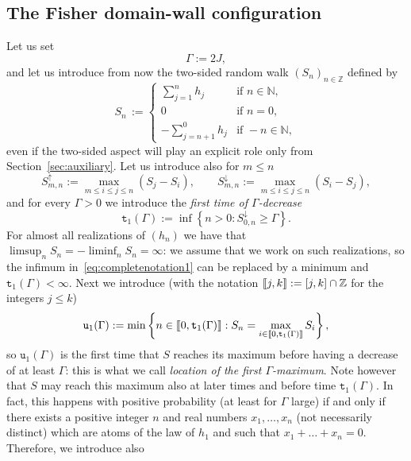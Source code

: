 \documentclass[10pt]{amsart}
\theoremstyle{definition}\newtheorem{defi}[theo]{Definition}\newtheorem{rema}[theo]{Remark}\newtheorem{exam}[theo]{Example}\newtheorem{exem}[theo]{Example}\newtheorem{nota}[theo]{Notation}
\newcommand{\bbN}{\mathbb{N}}
\newcommand{\bbZ}{\mathbb{Z}}
\newcommand{\gG}{\Gamma}
\renewcommand*\ss{\mathtt{u}}
\newcommand{\ttt}{\mathtt{t}}
\newcommand{\tu}{\ss}
\newcommand{\llbracket}{\mathopen{[\mkern -2.7mu[}}
\newcommand{\rrbracket}{\mathclose{]\mkern -2.7mu]}}
\newcommand{\lbra}{\llbracket}
\newcommand{\rbra}{\rrbracket}
\begin{document}
\subsection{The Fisher domain-wall configuration}\label{sec:Fisher}
Let us set
\begin{equation}
\gG:= 2 J,
\end{equation}
and let us introduce from now the two-sided random walk $(S_n)_{n \in \bbZ}$ defined by
\begin{equation}\label{eq:Sn}
S_n\, :=
\begin{cases}
\displaystyle\sum_{j=1}^n h_j & \text{if } n \in \bbN,\\
0 & \text{if } n=0,\\
\displaystyle-\sum_{j=n+1}^0 h_j& \text{if } -n \in \bbN,
\end{cases}
\end{equation}
even if the two-sided aspect will play an explicit role only from Section~\ref{sec:auxiliary}. Let us introduce also for $m\le n$
\begin{equation}
S^\uparrow_{m,n} :=  \max_{m\le i\le j\le n} (S_j-S_i), \qquad S^\downarrow_{m,n}:= \max_{m\le i\le j\le n} (S_i-S_j),
\end{equation}
and for every $\gG>0$ we introduce the \emph{first time of $\gG$-decrease}
\begin{equation}\label{eq:completenotation1}
\ttt_1(\gG):= \inf\left\{n > 0: S^\downarrow_{0,n} \ge \gG\right\}.
\end{equation}
For almost all realizations of $(h_n)$ we have that $\limsup_n S_n=-\liminf_n S_n= \infty$: we assume that we work on such realizations, so the infimum in~\eqref{eq:completenotation1} can be replaced by a minimum and $\ttt_1(\gG)<\infty$. Next we introduce (with the notation $\lbra j, k\rbra:=[j, k] \cap \bbZ$ for the integers $j\le k$)
\begin{equation}\label{eq:completenotation2}
\tu_1(\gG):= \min\left\{ n \in \lbra 0, \ttt_1(\gG)\rbra: S_n= \max_{i \in \lbra 0, \ttt_1(\gG)\rbra} S_i\right\},
\end{equation}
so $\tu_1(\gG)$ is the first time that $S$ reaches its maximum before having a decrease of at least $\gG$: this is what we call \emph{location of the first $\gG$-maximum}. Note however that $S$ may reach this maximum also at later times and before time $\ttt_1(\gG)$. In fact, this happens with positive probability (at least for $\gG$ large) if and only if there exists a positive integer $n$ and real numbers $x_1, \dots, x_n$ (not necessarily distinct) which are atoms of the law of $h_1$ and such that $x_1+\dots+ x_n=0$. Therefore, we introduce also
\end{document}
